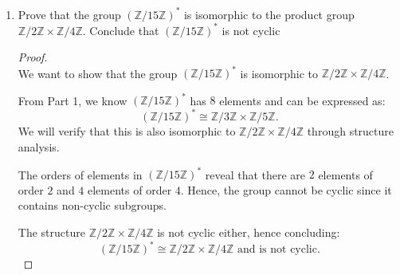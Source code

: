 \documentclass{article}
\begin{document}
\begin{enumerate}
\begin{proof}
    \end{proof}
    \item Prove that the group $(\mathbb{Z} / 15\mathbb{Z})^*$ is isomorphic to the product group $\mathbb{Z} / 2 \mathbb{Z} \times \mathbb{Z} / 4\mathbb{Z}$. Conclude that $(\mathbb{Z} / 15\mathbb{Z})^*$ is not cyclic 
    \begin{proof}
        \leavevmode \\ 
        We want to show that the group \((\mathbb{Z}/15\mathbb{Z})^*\) is isomorphic to \(\mathbb{Z}/2\mathbb{Z} \times \mathbb{Z}/4\mathbb{Z}\).

From Part 1, we know \((\mathbb{Z}/15\mathbb{Z})^*\) has \(8\) elements and can be expressed as:
\[
(\mathbb{Z}/15\mathbb{Z})^* \cong \mathbb{Z}/3\mathbb{Z} \times \mathbb{Z}/5\mathbb{Z}.
\]
We will verify that this is also isomorphic to \(\mathbb{Z}/2\mathbb{Z} \times \mathbb{Z}/4\mathbb{Z}\) through structure analysis.

The orders of elements in \((\mathbb{Z}/15\mathbb{Z})^*\) reveal that there are \(2\) elements of order \(2\) and \(4\) elements of order \(4\). Hence, the group cannot be cyclic since it contains non-cyclic subgroups.

The structure \(\mathbb{Z}/2\mathbb{Z} \times \mathbb{Z}/4\mathbb{Z}\) is not cyclic either, hence concluding:
\[
(\mathbb{Z}/15\mathbb{Z})^* \cong \mathbb{Z}/2\mathbb{Z} \times \mathbb{Z}/4\mathbb{Z} \text{ and is not cyclic.}
\]
    \end{proof}
\end{enumerate}
\end{document}
